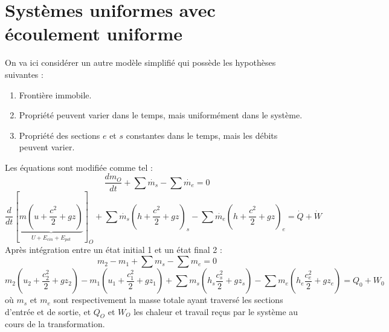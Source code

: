 \section{Systèmes uniformes avec écoulement uniforme}
On va ici considérer un autre modèle simplifié qui possède les hypothèses 
suivantes :
\begin{enumerate}
\item Frontière immobile.
\item Propriété peuvent varier dans le temps, mais uniformément dans le 
système.
\item Propriété des sections $e$ et $s$ constantes dans le temps, mais les 
débits peuvent varier.
\end{enumerate}
Les équations sont modifiée comme tel :
\begin{equation}
\frac{dm_O}{dt} + \sum \dot{m_s}-\sum \dot{m_e}=0
\end{equation}
\begin{equation}
\frac{d}{dt}\left[\underbrace{m\left(u+\frac{c^2}{2}+gz\right)}_{U+E_{cin}+
E_{pot}}\right]_O + \sum\dot{m_s}\left(h+\frac{c^2}{2}+gz\right)_s-
\sum\dot{m_e}\left(h+\frac{c^2}{2}+gz\right)_e = \dot{Q}+\dot{W}
\end{equation}
Après intégration entre un état initial 1 et un état final 2 : 
\begin{equation}
m_2-m_1 + \sum m_s - \sum m_e = 0
\end{equation}
\begin{equation}
m_2\left(u_2+\frac{c_2^2}{2}+gz_2\right)-m_1\left(u_1+\frac{c_1^2}{2}+gz_1
\right)+\sum m_s\left(h_s\frac{c_s^2}{2}+gz_s\right)-\sum m_e\left(h_e\frac{
c_e^2}{2}+gz_e\right) = Q_0+W_0
\end{equation}
où $m_s$ et $m_e$ sont respectivement la masse totale ayant traversé les sections
d’entrée et de sortie, et $Q_O$ et $W_O$ les chaleur et travail reçus par le système au
cours de la transformation.












